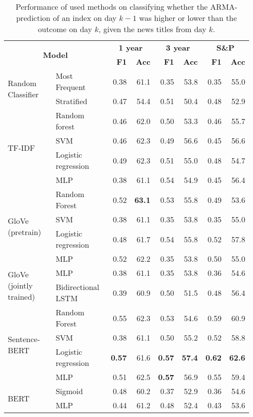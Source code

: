 \begin{table}[!htb]
    \centering
    \begin{tabular}{llrrrrrr}
    \hline
        \multicolumn{2}{c}{\multirow{2}{*}{\textbf{Model}}} & \multicolumn{2}{c}{\textbf{1 year}} & \multicolumn{2}{c}{\textbf{3 year}} & \multicolumn{2}{c}{\textbf{S\&P}} \\
      & & \textbf{F1} & \textbf{Acc} & \textbf{F1} & \textbf{Acc} & \textbf{F1} & \textbf{Acc} \\
        \hline \hline   
        \multirow{2}{*}{Random Classifier} & Most Frequent & 0.38 & 61.1 & 0.35 & 53.8 & 0.35 & 55.0  \\
        & Stratified & 0.47 & 54.4 & 0.51 & 50.4 & 0.48 & 52.9  \\
        \hline 
        \multirow{4}{*}{TF-IDF} & Random forest & 0.46 & 62.0 & 0.50 & 53.3 & 0.46 & 55.7  \\
        & SVM & 0.46 & 62.3 & 0.49 & 56.6 & 0.45 & 56.6 \\
        & Logistic regression & 0.49 & 62.3 & 0.51 & 55.0 & 0.48 & 54.7 \\
        & MLP & 0.38 & 61.1 &  0.54 & 54.9 & 0.45 & 56.4 \\
        \hline 
        \multirow{4}{*}{GloVe (pretrain)} & Random Forest & 0.52 & \textbf{63.1} & 0.53 & 55.8 & 0.49 & 53.6
        \\
        & SVM & 0.38 & 61.1 & 0.35 & 53.8 & 0.35 & 55.0 
        \\
        & Logistic regression & 0.48 & 61.7 & 0.54 & 55.8 & 0.52 & 57.8
        \\
        & MLP & 0.52 & 62.2 & 0.35 & 53.8 & 0.50 & 55.0 \\
        \hline 
        \multirow{2}{*}{GloVe (jointly trained)} & MLP & 0.38 & 61.1 & 0.35 & 53.8 & 0.36 & 54.6 \\
        & Bidirectional LSTM & 0.39 & 60.9 & 0.50 & 51.5 & 0.48 & 56.4 \\
        \hline 
        \multirow{4}{*}{Sentence-BERT} & Random Forest & 0.55 & 62.3 & 0.53 & 54.6 & 0.59 & 60.9 \\
        & SVM & 0.38 & 61.1 & 0.50 & 55.2 & 0.52 & 58.8 \\
        & Logistic regression & \textbf{0.57} & 61.6 & \textbf{0.57} & \textbf{57.4} & \textbf{0.62} & \textbf{62.6}   \\
        & MLP & 0.51 & 62.5 & \textbf{0.57} & 56.9 & 0.55 & 59.4 \\
        \hline
        \multirow{2}{*}{BERT} & Sigmoid & 0.48 & 60.2 & 0.37 & 52.9 & 0.36 & 54.6 \\
        & MLP & 0.44 & 61.2 & 0.48 & 52.4 & 0.43 & 53.6 \\
        \hline
    \end{tabular}
\caption{Performance of used methods on classifying whether the ARMA-prediction of an index on day $k-1$ was higher or lower than the outcome on day $k$, given the news titles from day $k$.}
\label{tab:res_arma_cdp}
\end{table}

